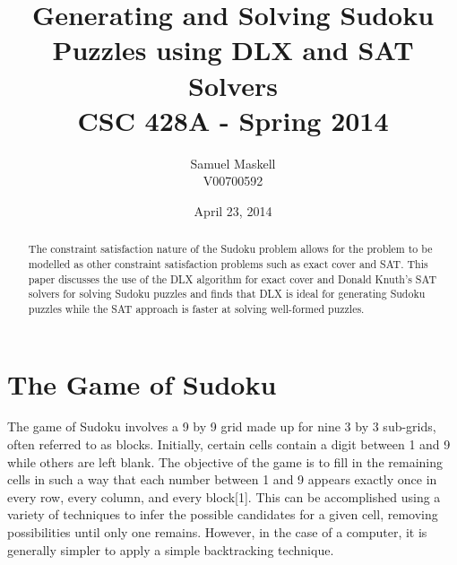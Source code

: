 \documentclass[12pt]{article}
\title{Generating and Solving Sudoku Puzzles using DLX and SAT Solvers\\CSC 428A - Spring 2014}
\date{April 23, 2014}
\author{Samuel Maskell\\ V00700592}
\newcounter{row}
\newcounter{col}
\begin{document}
\begin{titlepage}
\maketitle
\thispagestyle{empty}
\null
\vfill
\begin{abstract}
\noindent{}The constraint satisfaction nature of the Sudoku problem allows for the problem to be modelled as other constraint satisfaction problems such as exact cover and SAT. This paper discusses the use of the DLX algorithm for exact cover and Donald Knuth's SAT solvers for solving Sudoku puzzles and finds that DLX is ideal for generating Sudoku puzzles while the SAT approach is faster at solving well-formed puzzles.
\end{abstract}
\end{titlepage}
\pagestyle{fancy}
\section{The Game of Sudoku}
The game of Sudoku involves a 9 by 9 grid made up for nine 3 by 3 sub-grids, often referred to as blocks. Initially, certain cells contain a digit between 1 and 9 while others are left blank. The objective of the game is to fill in the remaining cells in such a way that each number between 1 and 9 appears exactly once in every row, every column, and every block[1]. This can be accomplished using a variety of techniques to infer the possible candidates for a given cell, removing possibilities until only one remains. However, in the case of a computer, it is generally simpler to apply a simple backtracking technique. \\
\end{document}
